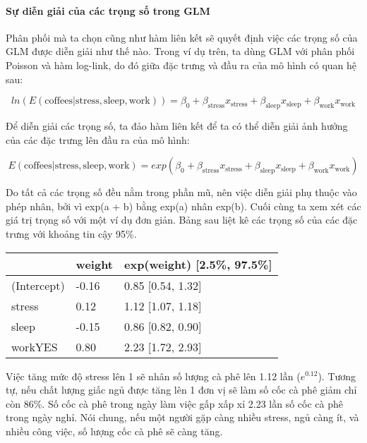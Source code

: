 \paragraph{Sự diễn giải của các trọng số trong GLM}

Phân phối mà ta chọn cũng như hàm liên kết sẽ quyết định việc các trọng số của GLM được diễn giải như thế nào. Trong ví dụ trên, ta dùng GLM với phân phối Poisson và hàm log-link, do đó giữa đặc trưng và đầu ra của mô hình có quan hệ sau:

$$ln(E(\text{coffees}|\text{stress},\text{sleep},\text{work}))=\beta_0+\beta_{\text{stress}}x_{\text{stress}}+\beta_{\text{sleep}}x_{\text{sleep}}+\beta_{\text{work}}x_{\text{work}}$$

Để diễn giải các trọng số, ta đảo hàm liên kết để ta có thể diễn giải ảnh hưởng của các đặc trưng lên đầu ra của mô hình:

$$E(\text{coffees}|\text{stress},\text{sleep},\text{work})=exp(\beta_0+\beta_{\text{stress}}x_{\text{stress}}+\beta_{\text{sleep}}x_{\text{sleep}}+\beta_{\text{work}}x_{\text{work}})$$

Do tất cả các trọng số đều nằm trong phần mũ, nên việc diễn giải phụ thuộc vào phép nhân, bởi vì exp(a + b) bằng exp(a) nhân exp(b). Cuối cùng ta xem xét các giá trị trọng số với một ví dụ đơn giản. Bảng sau liệt kê các trọng số của các đặc trưng với khoảng tin cậy 95\%.

\begin{table*}[!hbt]
\centering
\begin{tabular}{|l|l|l|}
\hline
            & \textbf{weight} & \textbf{exp(weight) {[}2.5\%, 97.5\%{]}} \\ \hline
(Intercept) & -0.16           & 0.85 {[}0.54, 1.32{]}                    \\ \hline
stress      & 0.12            & 1.12 {[}1.07, 1.18{]}                    \\ \hline
sleep       & -0.15           & 0.86 {[}0.82, 0.90{]}                    \\ \hline
workYES     & 0.80            & 2.23 {[}1.72, 2.93{]}                    \\ \hline
\end{tabular}
\end{table*}

Việc tăng mức độ stress lên 1 sẽ nhân số lượng cà phê lên 1.12 lần ($e^{0.12}$). Tương tự, nếu chất lượng giấc ngủ được tăng lên 1 đơn vị sẽ làm số cốc cà phê giảm chỉ còn 86\%. Số cốc cà phê trong ngày làm việc gấp xấp xỉ 2.23 lần số cốc cà phê trong ngày nghỉ. Nói chung, nếu một người gặp càng nhiều stress, ngủ càng ít, và nhiều công việc, số lượng cốc cà phê sẽ càng tăng.


